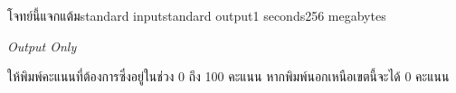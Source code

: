 \documentclass[11pt,a4paper]{article}
\begin{document}
\begin{problem}{โจทย์นี้แจกแต้ม}{standard input}{standard output}{1 seconds}{256 megabytes}

\textit{Output Only}

ให้พิมพ์คะแนนที่ต้องการซึ่งอยู่ในช่วง 0 ถึง 100 คะแนน หากพิมพ์นอกเหนือเขตนี้จะได้ 0 คะแนน

\end{problem}
\end{document}
